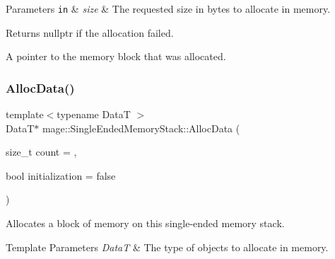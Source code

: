 \begin{DoxyParams}[1]{Parameters}
\mbox{\tt in}  & {\em size} & The requested size in bytes to allocate in memory. \\
\hline
\end{DoxyParams}
\begin{DoxyReturn}{Returns}
{\ttfamily nullptr} if the allocation failed. 

A pointer to the memory block that was allocated. 
\end{DoxyReturn}
\hypertarget{classmage_1_1_single_ended_memory_stack_ae957490450194631b81b9f6ba84f5f5a}{}\label{classmage_1_1_single_ended_memory_stack_ae957490450194631b81b9f6ba84f5f5a} 
\subsubsection{\texorpdfstring{Alloc\+Data()}{AllocData()}}
{\footnotesize\ttfamily template$<$typename DataT $>$ \\
DataT$\ast$ mage\+::\+Single\+Ended\+Memory\+Stack\+::\+Alloc\+Data (\begin{DoxyParamCaption}\item[{size\+\_\+t}]{count = {},  }\item[{bool}]{initialization = {\ttfamily false} }\end{DoxyParamCaption})\hspace{0.3cm}{\ttfamily [noexcept]}}

Allocates a block of memory on this single-\/ended memory stack.


\begin{DoxyTemplParams}{Template Parameters}
{\em DataT} & The type of objects to allocate in memory. \\
\hline
\end{DoxyTemplParams}

